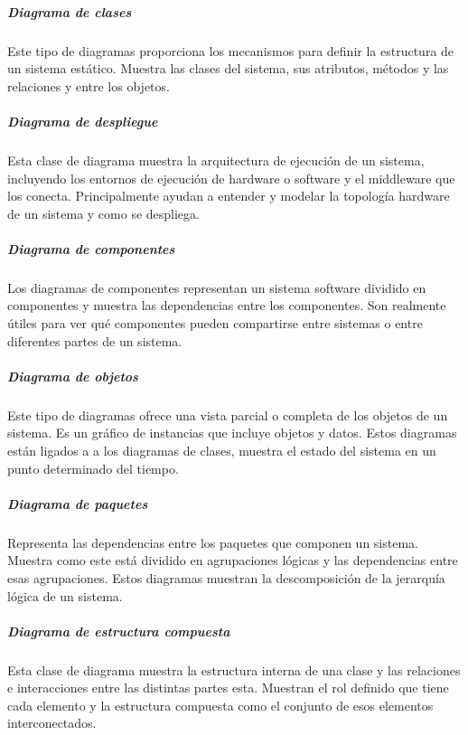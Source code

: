 \documentclass[a4paper, 12pt]{book}
\begin{document}
\subparagraph{Diagrama de clases}
Este tipo de diagramas proporciona los mecanismos para definir la estructura de un sistema estático. Muestra las clases del sistema, sus atributos, métodos y las relaciones y entre los objetos. 
\subparagraph{Diagrama de despliegue}
Esta clase de diagrama muestra la arquitectura de ejecución de un sistema, incluyendo los entornos de ejecución de hardware o software y el middleware que los conecta. Principalmente ayudan a entender y modelar la topología hardware de un sistema y como se despliega. 
\subparagraph{Diagrama de componentes} Los diagramas de componentes representan un sistema software dividido en componentes y muestra las dependencias entre los componentes. Son realmente útiles para ver qué componentes pueden compartirse entre sistemas o entre diferentes partes de un sistema.  
\subparagraph{Diagrama de objetos}
Este tipo de diagramas ofrece una vista parcial o completa de los objetos de un sistema. Es un gráfico de instancias que incluye objetos y datos. Estos diagramas están ligados a a los diagramas de clases, muestra el estado del sistema en un punto determinado del tiempo. 
\subparagraph{Diagrama de paquetes}
Representa las dependencias entre los paquetes que componen un sistema. Muestra como este está dividido en agrupaciones lógicas y las dependencias entre esas agrupaciones. Estos diagramas muestran la descomposición de la jerarquía lógica de un sistema.  
\subparagraph{Diagrama de estructura compuesta}
Esta clase de diagrama muestra la estructura interna de una clase y las relaciones e interacciones entre las distintas partes esta. Muestran el rol definido que tiene cada elemento y la estructura compuesta como el conjunto de esos elementos interconectados.
\end{document}
